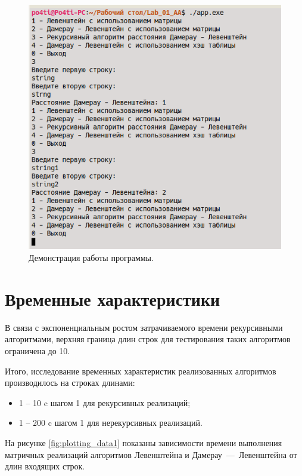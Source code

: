 \begin{figure}[ht!]
	\centering
	\includegraphics[width=170mm]{img/img_prog.png}
	\caption{Демонстрация работы программы.\label{overflow}}
	\label{fig:img_prog}
	\end{figure}


\clearpage

\section{Временные характеристики}

В связи с экспоненциальным ростом затрачиваемого времени рекурсивными алгоритмами, верхняя граница длин строк для тестирования таких алгоритмов ограничена до 10.

Итого, исследование временных характеристик реализованных алгоритмов производилось на строках длинами:

\begin{itemize}
    \item 1 -- 10 c шагом 1 для рекурсивных реализаций;
    \item 1 -- 200 c шагом 1 для нерекурсивных реализаций.
\end{itemize}

На рисунке \ref{fig:plotting_data1} показаны зависимости времени выполнения матричных реализаций алгоритмов Левенштейна и Дамерау~---~Левенштейна от длин входящих строк.


